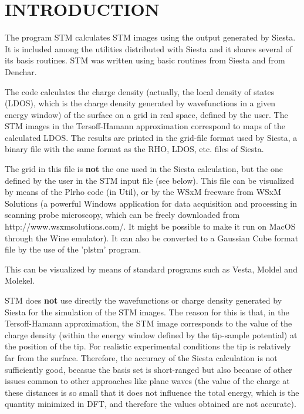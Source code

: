 
\tableofcontents

\newpage



\section{INTRODUCTION}

The program {\sc STM} calculates STM images using the output
generated by {\sc Siesta}.
It is included among the utilities distributed with {\sc Siesta}
and it shares several of its basis routines. 
{\sc STM} was written using basic routines from 
{\sc Siesta} and from {\sc Denchar}.

The code calculates the charge density (actually, the local density of
states (LDOS), which is the charge density generated by wavefunctions
in a given energy window) of the surface on a grid in real space,
defined by the user. The STM images in the Tersoff-Hamann
approximation correspond to maps of the calculated LDOS.
The results are printed in the grid-file format used by {\sc Siesta},
a  binary file with the same format as the RHO, LDOS, etc. files of
{\sc Siesta}.

The grid in this file is {\bf not} the one used in the {\sc Siesta}
calculation, but the one defined by the user in the {\sc STM}
input file (see below).
This file can be visualized by means of the {\sc Plrho}
code (in Util), or by the WSxM freeware from WSxM Solutions
(a powerful Windows application for data 
acquisition and processing in scanning probe microscopy,
which can be freely downloaded from http://www.wsxmsolutions.com/. It
might be possible to make it run on MacOS through the Wine emulator).
It can also be converted to a Gaussian Cube format file by the use of
the 'plstm' program.

This can be visualized by means of standard programs
such as {\sc Vesta}, {\sc Moldel} and {\sc Molekel}.


{\sc STM} does {\bf not} use directly the wavefunctions or charge density
generated by {\sc Siesta} for the simulation of the STM images. The
reason for this is that, in the Tersoff-Hamann approximation,
the STM image corresponds to the value of the charge density
(within the energy window defined by the tip-sample potential)
at the position of the tip. For realistic experimental conditions
the tip is relatively far from the surface. Therefore, the accuracy
of the {\sc Siesta} calculation is not sufficiently good, becasue
the basis set is short-ranged but also because of other issues
common to other approaches like plane waves (the value of the charge
at these distances is so small that it does not influence the
total energy, which is the quantity minimized in DFT, and therefore
the values obtained are not accurate).

